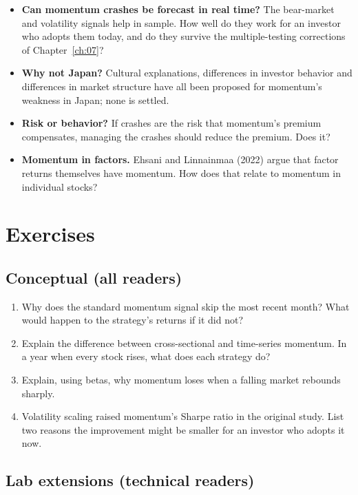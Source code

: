 \begin{itemize}
  \item \textbf{Can momentum crashes be forecast in real time?} The bear-market and volatility signals help in sample. How well do they work for an investor who adopts them today, and do they survive the multiple-testing corrections of Chapter~\ref{ch:07}?
  \item \textbf{Why not Japan?} Cultural explanations, differences in investor behavior and differences in market structure have all been proposed for momentum's weakness in Japan; none is settled.
  \item \textbf{Risk or behavior?} If crashes are the risk that momentum's premium compensates, managing the crashes should reduce the premium. Does it?
  \item \textbf{Momentum in factors.} Ehsani and Linnainmaa (2022) argue that factor returns themselves have momentum. How does that relate to momentum in individual stocks?
\end{itemize}

\section*{Exercises}

\subsection*{Conceptual (all readers)}

\begin{enumerate}
  \item Why does the standard momentum signal skip the most recent month? What would happen to the strategy's returns if it did not?
  \item Explain the difference between cross-sectional and time-series momentum. In a year when every stock rises, what does each strategy do?
  \item Explain, using betas, why momentum loses when a falling market rebounds sharply.
  \item Volatility scaling raised momentum's Sharpe ratio in the original study. List two reasons the improvement might be smaller for an investor who adopts it now.
\end{enumerate}

\subsection*{Lab extensions (technical readers)}

